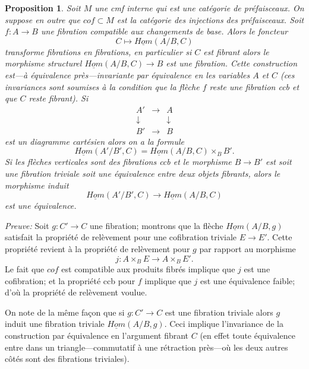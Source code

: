 \documentclass[12pt]{article}
\newtheorem{proposition}[lemma]{Proposition}
\begin{document}
\begin{proposition}
\label{hominternerelatif}
Soit $M$ une cmf interne qui est une cat\'egorie de pr\'efaisceaux.
On suppose
en outre que $cof \subset M$ est la cat\'egorie des injections des
pr\'efaisceaux. Soit
$f:A\rightarrow B$ une fibration compatible aux changements de base. Alors le
foncteur
$$
C\mapsto \underline{Hom}(A/B, C)
$$
transforme fibrations en
fibrations, en particulier si $C$ est fibrant alors le morphisme structurel
$\underline{Hom}(A/B, C)\rightarrow B$ est une fibration. Cette construction
est---\`a \'equivalence pr\`es---invariante par \'equivalence en les
variables $A$ et $C$ (ces invariances sont soumises \`a la condition que la
fl\`eche $f$ reste une fibration ccb et que $C$ reste fibrant).
Si
$$
\begin{array}{ccc}
A' &\rightarrow & A \\
\downarrow && \downarrow \\
B'&\rightarrow &B
\end{array}
$$
est un diagramme cart\'esien
alors on a la formule
$$
\underline{Hom}(A'/B', C) = \underline{Hom}(A/B,C)\times _BB'.
$$
Si les fl\`eches verticales sont des fibrations ccb et le morphisme
$B\rightarrow
B'$ est soit une fibration triviale soit une \'equivalence entre deux
objets fibrants, alors le morphisme induit
$$
\underline{Hom}(A'/B', C) \rightarrow  \underline{Hom}(A/B,C)
$$
est une \'equivalence.
\end{proposition}
{\em Preuve:} Soit $g:C'\rightarrow C$ une fibration; montrons que
la fl\`eche
$\underline{Hom}(A/B,g)$ satisfait la propri\'et\'e de rel\`evement pour une
cofibration triviale $E\rightarrow E'$. Cette propri\'et\'e revient \`a la
propri\'et\'e de rel\`evement pour $g$ par rapport au morphisme
$$
j:A\times _BE\rightarrow A\times _BE' .
$$
Le fait que $cof$ est compatible aux produits fibr\'es implique que $j$
est une cofibration; et la propri\'et\'e ccb pour $f$ implique que $j$
est une
\'equivalence faible; d'o\`u la propri\'et\'e de rel\`evement voulue.

On note de la m\^eme fa\c{c}on que si $g:C'\rightarrow C$ est une fibration
triviale alors $g$ induit une fibration triviale $\underline{Hom}(A/B,g)$.
Ceci
implique l'invariance de la construction par
\'equivalence en l'argument fibrant
$C$ (en effet toute \'equivalence entre dans un
triangle---commutatif \`a une r\'etraction pr\`es---o\`u les deux autres
c\^ot\'es
sont des fibrations triviales).
\end{document}
